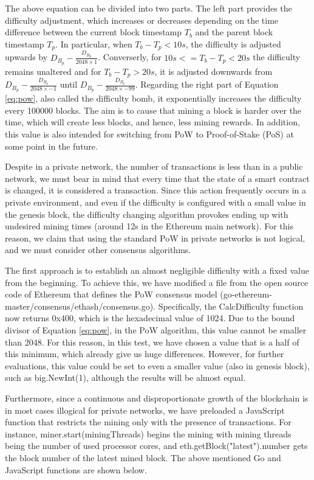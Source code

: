 The above equation can be divided into two parts. The left part provides the difficulty adjustment, which increases or decreases depending on the time difference between the current block timestamp $T_b$ and the parent block timestamp $T_p$. In particular, when $T_b - T_p < 10s$, the difficulty is adjusted upwards by $D_{B_p} - \frac{D_{B_p}}{2048 \times 1}$. Converserly, for $10s <= T_b - T_p < 20s$ the difficulty remains unaltered and for $T_b - T_p > 20s$, it is adjusted downwards from $D_{B_p} - \frac{D_{B_p}}{2048 \times -1}$ until $D_{B_p} - \frac{D_{B_p}}{2048 \times -99}$. Regarding the right part of Equation \ref{eq:pow}, also called the difficulty bomb, it exponentially increases the difficulty every 100000 blocks. The aim is to cause that mining a block is harder over the time, which will create less blocks, and hence, less mining rewards. In addition, this value is also intended for switching from PoW to Proof-of-Stake (PoS) at some point in the future.

Despite in a private network, the number of transactions is less than in a public network, we must bear in mind that every time that the state of a smart contract is changed, it is considered a transaction. Since this action frequently occurs in a private environment, and even if the difficulty is configured with a small value in the genesis block, the difficulty changing algorithm provokes ending up with undesired mining times (around 12s in the Ethereum main network). For this reason, we claim that using the standard PoW in private networks is not logical, and we must consider other consensus algorithms.

The first approach is to establish an almost negligible difficulty with a fixed value from the beginning. To achieve this, we have modified a file from the open source code of Ethereum that defines the PoW consensus model (go-ethereum-master/consensus/ethash/consensus.go). Specifically, the CalcDifficulty function now returns 0x400, which is the hexadecimal value of 1024. Due to the bound divisor of Equation \ref{eq:pow}, in the PoW algorithm, this value cannot be smaller than 2048. For this reason, in this test, we have chosen a value that is a half of this minimum, which already give us huge differences. However, for further evaluations, this value could be set to even a smaller value (also in genesis block), such as big.NewInt(1), although the results will be almost equal.

Furthermore, since a continuous and disproportionate growth of the blockchain is in most cases illogical for private networks, we have preloaded a JavaScript function that restricts the mining only with the presence of transactions. For instance, miner.start(miningThreads) begins the mining with mining threads being the number of used processor cores, and eth.getBlock("latest").number gets the block number of the latest mined block. The above mentioned Go and JavaScript functions are shown below.
\newline

